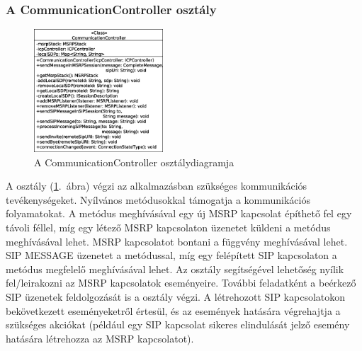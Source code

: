 \subsubsection*{A CommunicationController osztály}
\label{sec:client_communication_controller}

\begin{figure}
  \vspace{-15pt}
  \begin{center}
    \includegraphics[width=0.43\textwidth]{img/class_diagrams/client/eps/CommunicationController.eps}
  \end{center}
  \vspace{-15pt}
  \captionsetup{font=scriptsize}
  \caption{A CommunicationController osztálydiagramja}
   \label{fig:class_client_communication_controller}
  \vspace{-10pt}
\end{figure}

A  osztály (\ref{fig:class_client_communication_controller}.~ábra) végzi az alkalmazásban szükséges kommunikációs tevékenységeket. Nyílvános metódusokkal támogatja a kommunikációs folyamatokat. A  metódus meghívásával egy új MSRP kapcsolat építhető fel egy távoli féllel, míg egy létező MSRP kapcsolaton üzenetet küldeni a  metódus meghívásával lehet. MSRP kapcsolatot bontani a  függvény meghívásával lehet. SIP MESSAGE üzenetet a  metódussal, míg egy felépített SIP kapcsolaton a  metódus megfelelő meghívásával lehet. Az osztály segítségével lehetőség nyílik fel/leirakozni az MSRP kapcsolatok eseményeire. További feladatként a beérkező SIP üzenetek feldolgozását is a  osztály végzi. A létrehozott SIP kapcsolatokon bekövetkezett eseményeketről értesül, és az események hatására végrehajtja a szükséges akciókat (például egy SIP kapcsolat sikeres elindulását jelző esemény hatására létrehozza az MSRP kapcsolatot).

